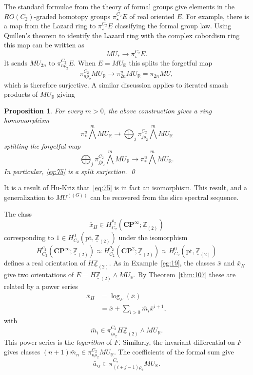 \documentclass{amsart}
\newtheorem{prop}[equation]{Proposition}
\theoremstyle{definition}
\theoremstyle{remark}
\newcommand{\Z}{{\mathbb Z}}
\newcommand{\R}{{\mathbb R}}
\newcommand{\cp}{\mathbf{CP}}
\newcommand{\mur}{MU_{\R}}
\newcommand{\mutn}[1]{MU^{(\!(#1)\!)}}
\newcommand{\piu}{\pi^{u}}
\newcommand{\mm}{m}
\newcommand{\zltm}{\underline{\Z}_{(2)}}
\newcommand{\gbar}{\bar}
\newcommand{\zt}{C_{2}}
\begin{document}
The standard formulae from the theory of formal groups give elements
in the $RO(\zt)$-graded homotopy groups $\pi^{\zt}_{\star}E$ of real
oriented $E$.  For example, there is a map from the Lazard ring to
$\pi^{\zt}_{\star}E$ classifying the formal group law.  Using
Quillen's theorem to identify the Lazard ring with the complex
cobordism ring this map can be written as
\[
MU_{\ast}\to \pi^{\zt}_{\star}E.
\]
It sends $MU_{2n}$ to $\pi^{\zt}_{n\rho_{2}}E$.  When $E=\mur$ this
splits the forgetful map
\begin{equation}\label{eq:71}
\pi^{\zt}_{n\rho_{2}}\mur\to \piu_{2n}\mur = \pi_{2n}MU,
\end{equation}
which is therefore surjective.   A similar discussion applies to
iterated smash products of $\mur$ giving

\begin{prop}
\label{thm:171} For every $m>0$, the above construction gives a ring
homomorphism
\begin{equation}\label{eq:86}
\piu_{\ast}\bigwedge^{m}\mur\to \bigoplus_{j}\pi^{\zt}_{j\rho_{2}}\bigwedge^{m}\mur
\end{equation}
splitting the forgetful map
\begin{equation}\label{eq:75}
\bigoplus_{j}\pi^{\zt}_{j\rho_{2}}\bigwedge^{m}\mur \to \piu_{\ast}\bigwedge^{m}\mur.
\end{equation}
In particular, \eqref{eq:75} is a split surjection.  \qed
\end{prop}

It is a result of Hu-Kriz\cite{MR1808224} that~\eqref{eq:75} is in fact
an isomorphism.  This result, and a generalization to $\mutn{G}$ can
be recovered from the slice spectral sequence.

The class
\[
\gbar{x}_{H}\in H^{\rho_{2}}_{\zt}(\cp^{\infty};\zltm)
\]
corresponding to $1\in H^{0}_{\zt}(\text{pt},\zltm)$ under the isomorphism
\[
H^{\rho_{2}}_{\zt}(\cp^{\infty};\zltm) \approx
H^{\rho_{2}}_{\zt}(\cp^{2};\zltm) \approx
H^{0}_{\zt}(\text{pt},\zltm)
\]
defines a real orientation of $H\zltm$.  As in Example~\ref{eg:19}, the
classes $\gbar{x}$ and $\gbar{x}_{H}$ give two orientations of
$E=H\zltm\wedge\mur$.  By Theorem~\ref{thm:107} these are related by a
power series
\begin{align*}
\gbar{x}_{H}
&= \log_{F}(\gbar{x}) \\
&=\gbar{x}+\sum_{i>0}\gbar{\mm}_{i}\gbar{x}^{i+1},
\end{align*}
with
\[
\gbar{\mm}_{i}\in \pi^{\zt}_{i\rho_{2}}H\zltm\wedge \mur.
\]
This power series is the {\em logarithm} of $F$.  Similarly, the
invariant differential on $F$ gives classes $(n+1)\gbar{\mm}_{n}\in
\pi^{\zt}_{n\rho_{2}}\mur$.  The coefficients of the formal sum give
\[
\gbar{a}_{ij}\in \pi^{\zt}_{(i+j-1)\rho_{2}}\mur.
\]
\end{document}
